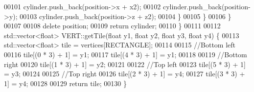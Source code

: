 \begin{DoxyCode}
00101                 cylinder.push\_back(position->x + x2);
00102                 cylinder.push\_back(position->y);
00103                 cylinder.push\_back(position->z + z2);
00104             \}
00105         \}
00106     \}
00107     
00108     \textcolor{keyword}{delete} position;
00109     \textcolor{keywordflow}{return} cylinder;
00110 \}
00111 
00112 std::vector<float> VERT::getTile(\textcolor{keywordtype}{float} y1, \textcolor{keywordtype}{float} y2, \textcolor{keywordtype}{float} y3, \textcolor{keywordtype}{float} y4) \{
00113     std::vector<float> tile = vertices[RECTANGLE];
00114 
00115     \textcolor{comment}{//Bottom left}
00116     tile[(0 * 3) + 1] = y1;
00117     tile[(4 * 3) + 1] = y1;
00118 
00119     \textcolor{comment}{//Bottom right}
00120     tile[(1 * 3) + 1] = y2;
00121 
00122     \textcolor{comment}{//Top left}
00123     tile[(5 * 3) + 1] = y3;
00124 
00125     \textcolor{comment}{//Top right}
00126     tile[(2 * 3) + 1] = y4;
00127     tile[(3 * 3) + 1] = y4;
00128 
00129     \textcolor{keywordflow}{return} tile;
00130 \}
\end{DoxyCode}
